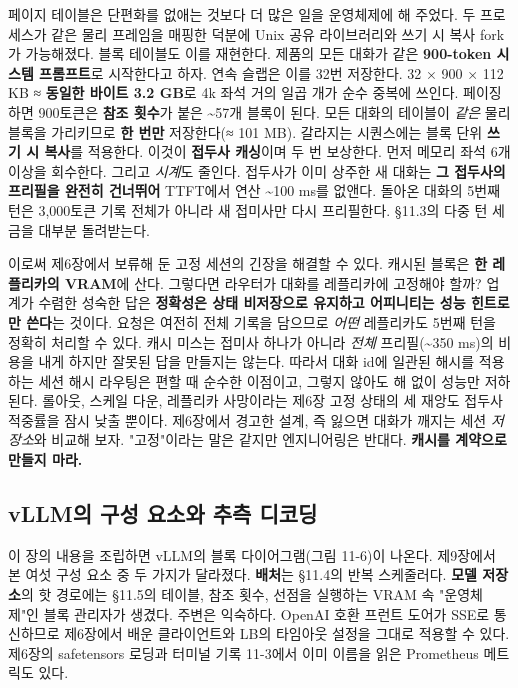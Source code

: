 페이지 테이블은 단편화를 없애는 것보다 더 많은 일을 운영체제에 해 주었다. 두 프로세스가 같은 물리 프레임을 매핑한 덕분에 Unix 공유 라이브러리와 쓰기 시 복사 fork가 가능해졌다. 블록 테이블도 이를 재현한다. 제품의 모든 대화가 같은 \textbf{900-token 시스템 프롬프트}로 시작한다고 하자. 연속 슬랩은 이를 32번 저장한다. 32 × 900 × 112 KB ≈ \textbf{동일한 바이트 3.2 GB}로 4k 좌석 거의 일곱 개가 순수 중복에 쓰인다. 페이징하면 900토큰은 \textbf{참조 횟수}가 붙은 \textasciitilde{}57개 블록이 된다. 모든 대화의 테이블이 \textit{같은} 물리 블록을 가리키므로 \textbf{한 번만} 저장한다(≈ 101 MB). 갈라지는 시퀀스에는 블록 단위 \textbf{쓰기 시 복사}를 적용한다. 이것이 \textbf{접두사 캐싱}이며 두 번 보상한다. 먼저 메모리 좌석 6개 이상을 회수한다. 그리고 \textit{시계}도 줄인다. 접두사가 이미 상주한 새 대화는 \textbf{그 접두사의 프리필을 완전히 건너뛰어} TTFT에서 연산 \textasciitilde{}100 ms를 없앤다. 돌아온 대화의 5번째 턴은 3,000토큰 기록 전체가 아니라 새 접미사만 다시 프리필한다. §11.3의 다중 턴 세금을 대부분 돌려받는다.

이로써 제6장에서 보류해 둔 고정 세션의 긴장을 해결할 수 있다. 캐시된 블록은 \textbf{한 레플리카의 VRAM}에 산다. 그렇다면 라우터가 대화를 레플리카에 고정해야 할까? 업계가 수렴한 성숙한 답은 \textbf{정확성은 상태 비저장으로 유지하고 어피니티는 성능 힌트로만 쓴다}는 것이다. 요청은 여전히 전체 기록을 담으므로 \textit{어떤} 레플리카도 5번째 턴을 정확히 처리할 수 있다. 캐시 미스는 접미사 하나가 아니라 \textit{전체} 프리필(\textasciitilde{}350 ms)의 비용을 내게 하지만 잘못된 답을 만들지는 않는다. 따라서 대화 id에 일관된 해시를 적용하는 세션 해시 라우팅은 편할 때 순수한 이점이고, 그렇지 않아도 해 없이 성능만 저하된다. 롤아웃, 스케일 다운, 레플리카 사망이라는 제6장 고정 상태의 세 재앙도 접두사 적중률을 잠시 낮출 뿐이다. 제6장에서 경고한 설계, 즉 잃으면 대화가 깨지는 세션 \textit{저장소}와 비교해 보자. "고정"이라는 말은 같지만 엔지니어링은 반대다. \textbf{캐시를 계약으로 만들지 마라.}

\subsection*{vLLM의 구성 요소와 추측 디코딩}

이 장의 내용을 조립하면 vLLM의 블록 다이어그램(그림 11-6)이 나온다. 제9장에서 본 여섯 구성 요소 중 두 가지가 달라졌다. \textbf{배처}는 §11.4의 반복 스케줄러다. \textbf{모델 저장소}의 핫 경로에는 §11.5의 테이블, 참조 횟수, 선점을 실행하는 VRAM 속 "운영체제"인 블록 관리자가 생겼다. 주변은 익숙하다. OpenAI 호환 프런트 도어가 SSE로 통신하므로 제6장에서 배운 클라이언트와 LB의 타임아웃 설정을 그대로 적용할 수 있다. 제6장의 safetensors 로딩과 터미널 기록 11-3에서 이미 이름을 읽은 Prometheus 메트릭도 있다.

